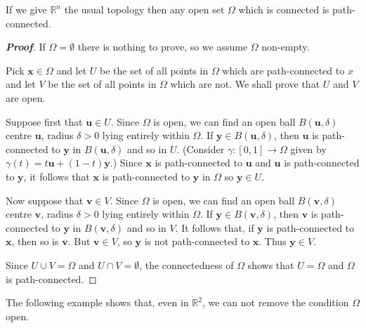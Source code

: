 \begin{theorem}\label{T;connected to path}
If we give ${\mathbb R}^{n}$ the usual topology
then any open set $\Omega$ which is connected is path-connected.
\end{theorem}
\begin{proof}[\bf Proof]
If $\Omega=\emptyset$ there is nothing to prove,
so we assume $\Omega$ non-empty.

Pick ${\mathbf x}\in\Omega$ and let $U$ be the set of all points
in $\Omega$ which are path-connected to $x$ and let $V$ be the set 
of all points in $\Omega$ which are not. 
We shall prove
that $U$ and $V$ are open.

Suppose first that ${\mathbf u}\in U$. Since $\Omega$
is open, we can find an open ball $B({\mathbf u},\delta)$
centre ${\mathbf u}$, radius $\delta>0$ lying entirely within
$\Omega$. If ${\mathbf y}\in B({\mathbf u},\delta)$,
then ${\mathbf u}$ is path-connected to ${\mathbf y}$ in 
$B({\mathbf u},\delta)$ and so in $U$.
(Consider $\gamma:[0,1]\rightarrow\Omega$ given by
$\gamma(t)=t{\mathbf u}+(1-t){\mathbf y}$.)
Since ${\mathbf x}$ is path-connected to ${\mathbf u}$
and
${\mathbf u}$ is path-connected to ${\mathbf y}$,
it follows that
${\mathbf x}$ is path-connected to ${\mathbf y}$
in $\Omega$ so ${\mathbf y}\in U$.

Now suppose that ${\mathbf v}\in V$. Since $\Omega$
is open, we can find an open ball $B({\mathbf v},\delta)$
centre ${\mathbf v}$, radius $\delta>0$ lying entirely within
$\Omega$. If ${\mathbf y}\in B({\mathbf v},\delta)$,
then ${\mathbf v}$ is path-connected to ${\mathbf y}$ in 
$B({\mathbf v},\delta)$ and so in $V$. It follows that,
if ${\mathbf y}$ is path-connected to ${\mathbf x}$,
then so is  ${\mathbf v}$. But ${\mathbf v}\in V$,
so ${\mathbf y}$ is not path-connected to ${\mathbf x}$.
Thus ${\mathbf y}\in V$.

Since $U\cup V=\Omega$ and $U\cap V=\emptyset$, the connectedness
of $\Omega$ shows that $U=\Omega$ and $\Omega$ is path-connected.
\end{proof} 



The following example shows that, even in ${\mathbb R}^{2}$,
we can not remove the condition $\Omega$ open.



